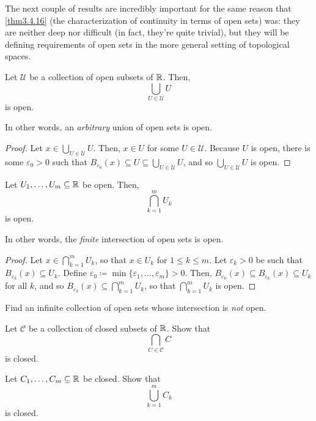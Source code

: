 The next couple of results are incredibly important for the same reason that \cref{thm3.4.16} (the characterization of continuity in terms of open sets) was:  they are neither deep nor difficult (in fact, they're quite trivial), but they will be defining requirements of open sets in the more general setting of topological spaces.
\begin{thm}\label{thm3.4.34}
Let $\mathcal{U}$ be a collection of open subsets of $\mathbb{R}$.  Then,
\begin{equation}
\bigcup _{U\in \mathcal{U}}U
\end{equation}
is open.
\begin{rmk}
In other words, an \emph{arbitrary} union of open sets is open.
\end{rmk}
\begin{proof}
Let $x\in \bigcup _{U\in \mathcal{U}}U$.  Then, $x\in U$ for some $U\in \mathcal{U}$.  Because $U$ is open, there is some $\varepsilon _0>0$ such that $B_{\varepsilon _0}(x)\subseteq U\subseteq \bigcup _{U\in \mathcal{U}}U$, and so $\bigcup _{U\in \mathcal{U}}U$ is open.
\end{proof}
\end{thm}
\begin{thm}\label{thm3.4.36}
Let $U_1,\ldots ,U_m\subseteq \mathbb{R}$ be open.  Then,
\begin{equation}
\bigcap _{k=1}^mU_k
\end{equation}
is open.
\begin{rmk}
In other words, the \emph{finite} intersection of open sets is open.
\end{rmk}
\begin{proof}
Let $x\in \bigcap _{k=1}^mU_k$, so that $x\in U_k$ for $1\leq k\leq m$.  Let $\varepsilon _k>0$ be such that $B_{\varepsilon _k}(x)\subseteq U_k$.  Define $\varepsilon _0\coloneqq \min \{ \varepsilon _1,\ldots ,\varepsilon _m\} >0$.  Then, $B_{\varepsilon _0}(x)\subseteq B_{\varepsilon _k}(x)\subseteq U_k$ for all $k$, and so $B_{\varepsilon _0}(x)\subseteq \bigcap _{k=1}^mU_k$, so that $\bigcap _{k=1}^mU_k$ is open.
\end{proof}
\end{thm}
\begin{exr}
Find an infinite collection of open sets whose intersection is \emph{not} open.
\end{exr}
\begin{exr}\label{exr3.4.38x}
Let $\mathcal{C}$ be a collection of closed subsets of $\mathbb{R}$.  Show that
\begin{equation}
\bigcap _{C\in \mathcal{C}}C
\end{equation}
is closed.
\end{exr}
\begin{exr}\label{exr3.4.40}
Let $C_1,\ldots ,C_m\subseteq \mathbb{R}$ be closed.  Show that
\begin{equation}
\bigcup _{k=1}^mC_k
\end{equation}
is closed.
\end{exr}

